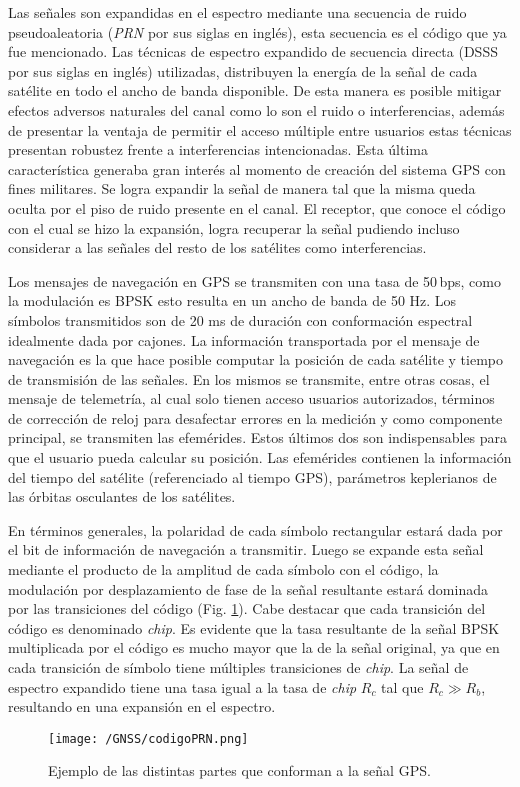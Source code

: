 \documentclass[a4paper,12pt,oneside,onecolumn,final,openright]{book}%
\begin{document}
	Las señales son expandidas en el espectro mediante una secuencia de ruido pseudoaleatoria (\textit{PRN} por sus siglas en inglés), esta secuencia es el código que ya fue mencionado. Las técnicas de espectro expandido de secuencia directa (DSSS por sus siglas en inglés) utilizadas, distribuyen la energía de la señal de cada satélite en todo el ancho de banda disponible. De esta manera es posible mitigar efectos adversos naturales del canal como lo son el ruido o interferencias, además de presentar la ventaja de permitir el acceso múltiple entre usuarios estas técnicas presentan robustez frente a interferencias intencionadas. Esta última característica generaba gran interés al momento de creación del sistema GPS con fines militares. Se logra expandir la señal de manera tal que la misma queda oculta por el piso de ruido presente en el canal. El receptor, que conoce el código con el cual se hizo la expansión, logra recuperar la señal pudiendo incluso considerar a las señales del resto de los satélites como interferencias. 
	
	Los mensajes de navegación en GPS se transmiten con una tasa de 50\,bps, como la modulación es BPSK esto resulta en un ancho de banda de 50 Hz. Los símbolos transmitidos son de 20 ms de duración con conformación espectral idealmente dada por cajones. La información transportada por el mensaje de navegación es la que hace posible computar la posición de cada satélite y tiempo de transmisión de las señales. En los mismos se transmite, entre otras cosas, el mensaje de telemetría, al cual solo tienen acceso usuarios autorizados, términos de corrección de reloj para desafectar errores en la medición y como componente principal, se transmiten las efemérides. Estos últimos dos son indispensables para que el usuario pueda calcular su posición. Las efemérides contienen la información del tiempo del satélite (referenciado al tiempo GPS), parámetros keplerianos de las órbitas osculantes de los satélites.
	
	En términos generales, la polaridad de cada símbolo rectangular estará dada por el bit de información de navegación a transmitir. Luego se expande esta señal mediante el producto de la amplitud de cada símbolo con el código, la modulación por desplazamiento de fase de la señal resultante estará dominada por las transiciones del código (Fig. \ref{fig:PRN}). Cabe destacar que cada transición del código es denominado \textit{chip}. Es evidente que la tasa resultante de la señal BPSK multiplicada por el código es mucho mayor que la de la señal original, ya que en cada transición de símbolo tiene múltiples transiciones de \textit{chip}. La señal de espectro expandido tiene una tasa igual a la tasa de \textit{chip} $R_c$ tal que $R_c \gg R_b$, resultando en una expansión en el espectro.
\begin{figure}%
    \centering
    \texttt{[image: /GNSS/codigoPRN.png]}
    \caption{Ejemplo de las distintas partes que conforman a la señal GPS.}
    \label{fig:PRN}
\end{figure}
\end{document}
